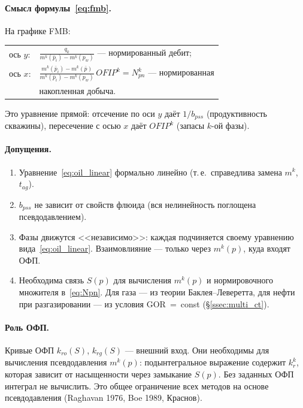 ﻿\documentclass[12pt,a4paper]{article}
\begin{document}
\paragraph{Смысл формулы~\eqref{eq:fmb}.}
На графике FMB:

\begin{center}
\begin{tabular}{ll}
  ось $y$: & $\displaystyle\frac{q_k}
  {m^k(\bar{p}_i) - m^k(p_w)}$
  --- нормированный дебит; \\[6pt]
  ось $x$: & $\displaystyle
  \frac{m^k(\bar{p}_i) - m^k(\bar{p})}
  {m^k(\bar{p}_i) - m^k(p_w)}\,OFIP^k
  = N_{pn}^k$ --- нормированная \\
  & накопленная добыча.
\end{tabular}
\end{center}
Это уравнение прямой: отсечение по оси $y$ даёт
$1/b_{pss}$ (продуктивность скважины), пересечение
с осью $x$ даёт $OFIP^k$ (запасы $k$-ой фазы).

\paragraph{Допущения.}
\begin{enumerate}[nosep]
  \item Уравнение~\eqref{eq:oil_linear} формально
  линейно (т.\,е.\ справедлива замена $m^k$, $t_{ag}$).
  \item $b_{pss}$ не зависит от свойств флюида (вся
  нелинейность поглощена псевдодавлением).
  \item Фазы движутся <<независимо>>: каждая
  подчиняется своему уравнению вида~\eqref{eq:oil_linear}.
  Взаимовлияние --- только через $m^k(p)$, куда входят ОФП.
  \item Необходима связь $S(p)$ для вычисления $m^k(p)$
  и нормировочного множителя в~\eqref{eq:Npn}.
  Для газа --- из теории Баклея--Леверетта,
  для нефти при разгазировании ---
  из условия GOR~=~const (\S\ref{ssec:multi_ct}).
\end{enumerate}

\paragraph{Роль ОФП.}
Кривые ОФП $k_{ro}(S)$, $k_{rg}(S)$ --- внешний вход.
Они необходимы для вычисления псевдодавления $m^k(p)$:
подынтегральное выражение содержит $k_r^k$, которая
зависит от насыщенности через замыкание $S(p)$.
Без заданных ОФП интеграл не вычислить. Это общее
ограничение всех методов на основе псевдодавления
(Raghavan 1976, Boe 1989, Краснов).
\end{document}
